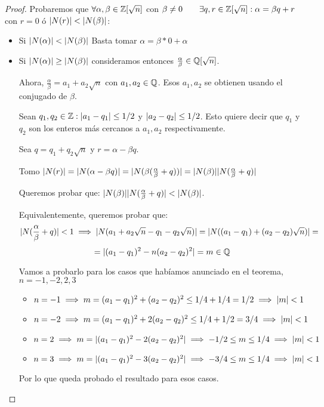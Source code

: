 \begin{proof}
	Probaremos que $\forall \alpha, \beta \in \mathbb{Z}[\sqrt{n}]$ con $\beta \neq 0 \quad \quad \exists q,r \in \mathbb{Z}[\sqrt{n}] : \alpha = \beta q + r$ con $r=0$ ó $\lvert N(r)\rvert < \lvert N(\beta)\rvert$:

	\begin{itemize}
	\item Si $\lvert N(\alpha)\rvert < \lvert N(\beta)\rvert$ Basta tomar $\alpha  =  \beta * 0 + \alpha$

	\item Si $\lvert N(\alpha)\rvert \geq \lvert N(\beta)\rvert$ consideramos entonces  $\frac{\alpha}{\beta} \in \mathbb{Q}[\sqrt{n}]$.

	Ahora, $\frac{\alpha}{\beta} = a_1 + a_2\sqrt{n}$ con $a_1, a_2 \in \mathbb{Q} $. Esos $a_1,a_2$ se obtienen usando el conjugado de $\beta$.

	Sean $q_1,q_2 \in \mathbb{Z} : \lvert a_1-q_1\rvert\leq 1/2$ y $\lvert a_2-q_2\rvert\leq 1/2$. Esto quiere decir que $q_1$ y $q_2$ son los enteros más cercanos a $a_1,a_2$ respectivamente.

	Sea $q=q_1+q_2\sqrt{n}$  y $r = \alpha - \beta q$.

	Tomo $\lvert N(r)\rvert = \lvert N(\alpha - \beta q)\rvert = \lvert N(\beta(\frac{\alpha}{\beta}+ q))\rvert = \lvert N(\beta)\rvert\lvert N(\frac{\alpha}{\beta}+ q)\rvert$

	Queremos probar que: $\lvert N(\beta)\rvert\lvert N(\frac{\alpha}{\beta}+ q)\rvert < \lvert N(\beta)\rvert$.

	Equivalentemente, queremos probar que:
	\[
	  \lvert N(\frac{\alpha}{\beta}+ q)\rvert < 1 \implies \lvert N(a_1+a_2\sqrt{n}-q_1 -q_2\sqrt{n})\rvert = \lvert N((a_1-q_1) + (a_2-q_2)\sqrt{n})\rvert = \]
	  \[
	 = \lvert(a_1-q_1)^2 - n(a_2-q_2)^2\rvert = m \in \mathbb{Q}
	 \]

Vamos a probarlo para los casos que habíamos anunciado en el teorema, $n = -1,-2,2,3$

\begin{itemize}
	\item $n=-1 \implies m= (a_1-q_1)^2 +(a_2-q_2)^2 \leq 1/4 + 1/4 = 1/2 \implies \lvert m\rvert < 1$

	\item $n=-2 \implies m = (a_1-q_1)^2 +2(a_2-q_2)^2 \leq 1/4 + 1/2 = 3/4 \implies \lvert m\rvert < 1$

	\item $n=2 \implies m = |(a_1-q_1)^2 -2(a_2-q_2)^2 |\implies -1/2 \leq m \leq 1/4 \implies \lvert m\rvert < 1$

	\item $n=3 \implies m = |(a_1-q_1)^2 -3(a_2-q_2)^2| \implies -3/4 \leq m \leq 1/4 \implies \lvert m\rvert < 1$
\end{itemize}

Por lo que queda probado el resultado para esos casos.

\end{itemize}
\end{proof}

